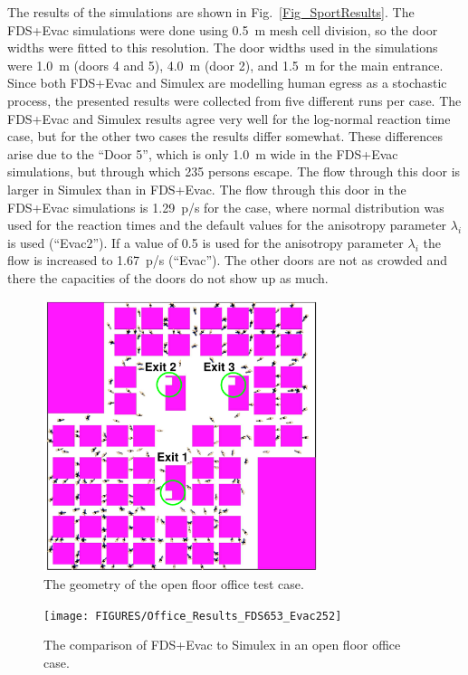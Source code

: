 \documentclass[12pt,a4paper,final,twoside]{stylevk}
\begin{document}
\begin{enumerate}
  
  The results of the simulations are shown in
  Fig.~\ref{Fig_SportResults}.  The FDS+Evac simulations were done
  using 0.5~m mesh cell division, so the door widths were fitted to
  this resolution.  The door widths used in the simulations were 1.0~m
  (doors 4 and 5), 4.0~m (door 2), and 1.5~m for the main entrance.
  Since both FDS+Evac and Simulex are modelling human egress as a
  stochastic process, the presented results were collected from five
  different runs per case.  The FDS+Evac and Simulex results agree
  very well for the log-normal reaction time case, but for the other
  two cases the results differ somewhat.  These differences arise due
  to the ``Door 5'', which is only 1.0~m wide in the FDS+Evac
  simulations, but through which 235 persons escape.  The flow through
  this door is larger in Simulex than in FDS+Evac.  The flow through
  this door in the FDS+Evac simulations is 1.29~p/s for the case,
  where normal distribution was used for the reaction times and the
  default values for the anisotropy parameter $\lambda_i$ is used
  (``Evac2'').  If a value of 0.5 is used for the anisotropy parameter
  $\lambda_i$ the flow is increased to 1.67~p/s (``Evac'').  The other
  doors are not as crowded and there the capacities of the doors do
  not show up as much.

%
\begin{figure}[!tb]
  \centerline{\includegraphics[clip=true,
  width=80mm]{FIGURES/OpenFloorGeom}} 
  \caption{The geometry of the open floor office test
    case.}\label{Fig_OpenFloorGeom}
\end{figure}
%

%
\begin{figure}[!b]
  \centerline{\texttt{[image: FIGURES/Office\_Results\_FDS653\_Evac252]}} 
  \caption{The comparison of FDS+Evac to Simulex in an open floor
    office case.}\label{Fig_OpenFloorResults} 
\end{figure}
%


\end{enumerate}
\end{document}
